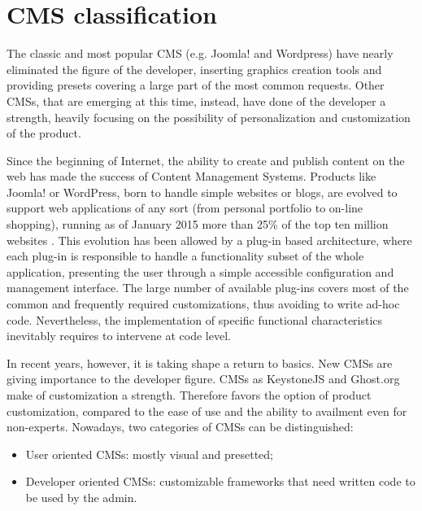 \section{CMS classification}
\label{sec:CMS_class}

The classic and most popular CMS (e.g. Joomla! and Wordpress) have nearly eliminated the figure of the developer, inserting graphics creation tools and providing presets covering a large part of the most common requests. Other CMSs, that are emerging at this time, instead, have done of the developer a strength, heavily focusing on the possibility of personalization and customization of the product.

Since the beginning of Internet, the ability to create and publish content on the web has made the success of Content Management Systems. Products like Joomla! or WordPress, born to handle simple websites or blogs, are evolved to support web applications of any sort (from personal portfolio to on-line shopping), running as of January 2015 more than 25\% of the top ten million websites \cite{cms_stats}. This evolution has been allowed by a plug-in based architecture, where each plug-in is responsible to handle a functionality subset of the whole application, presenting the user through a simple accessible configuration and management interface.
The large number of available plug-ins covers most of the common and frequently required customizations, thus avoiding to write ad-hoc code. Nevertheless, the implementation of specific functional characteristics inevitably requires to intervene at code level.

In recent years, however, it is taking shape a return to basics. New CMSs are giving importance to the developer figure. CMSs as KeystoneJS and Ghost.org make of customization a strength.
Therefore favors the option of product customization, compared to the ease of use and the ability to availment even for non-experts.
Nowadays, two categories of CMSs can be distinguished:
\begin{itemize}
\item User oriented CMSs: mostly visual and presetted;
\item Developer oriented CMSs: customizable frameworks that need written code to be used by the admin.
\end{itemize}